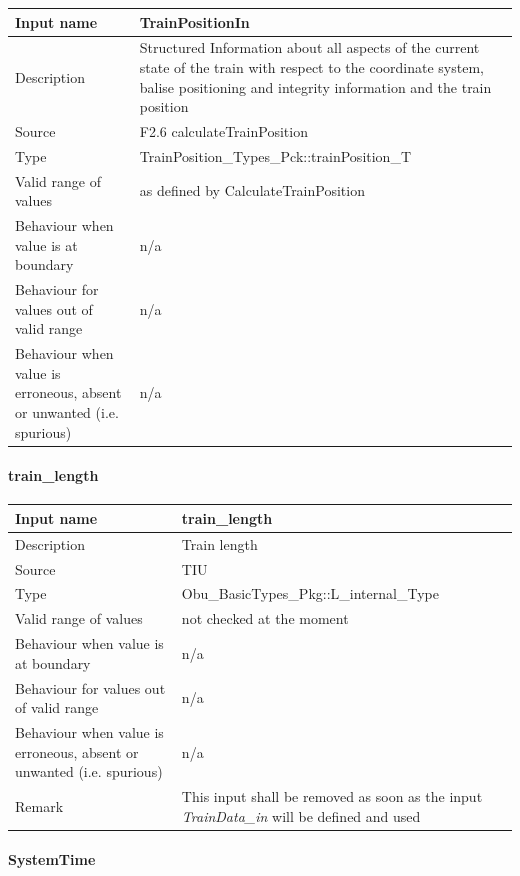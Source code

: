\begin{longtable}{p{}p{}}
\toprule
Input name				& TrainPositionIn\\
\midrule
Description				& Structured Information about all aspects of the current state of the train with respect to the coordinate system, balise positioning and integrity information and the train position\\
\midrule
Source					& F2.6 calculateTrainPosition \\ 
\midrule
Type					& TrainPosition\_Types\_Pck::trainPosition\_T \\
\midrule
Valid range of values	& as defined by CalculateTrainPosition \\
\midrule
Behaviour when value is at boundary	& n/a\\
\midrule
Behaviour for values out of valid range	& n/a\\
\midrule
Behaviour when value is erroneous, absent or unwanted (i.e. spurious) & n/a\\
\bottomrule
\end{longtable}

\paragraph{train\_length}

\begin{longtable}{p{}p{}}
\toprule
Input name				& train\_length\\
\midrule
Description				& Train length\\
\midrule
Source					& TIU \\ 
\midrule
Type					& Obu\_BasicTypes\_Pkg::L\_internal\_Type\\
\midrule
Valid range of values	& not checked at the moment \\
\midrule
Behaviour when value is at boundary	& n/a\\
\midrule
Behaviour for values out of valid range	& n/a\\
\midrule
Behaviour when value is erroneous, absent or unwanted (i.e. spurious) & n/a\\
\midrule
Remark & This input shall be removed as soon as the input \emph{TrainData\_in} will be defined and used\\
\bottomrule


\end{longtable}

\paragraph{SystemTime}

